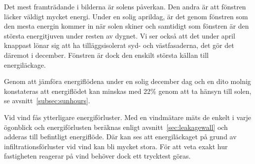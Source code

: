 Det mest framträdande i bilderna är solens påverkan. Den andra är att fönstren läcker väldigt 
mycket energi. Under en solig aprildag, är det genom fönstren som den mesta energin 
kommer in när solen skiner och samtidigt som fönstren är den största energitjuven under 
resten av dygnet. Vi ser också att det under april knappast lönar sig att ha tilläggsisolerat syd-
 och västfasaderna, det gör det däremot i december. Fönstren är dock den enskilt största 
 källan till energiläckage.

Genom att jämföra energiflödena under en solig december dag och en dito molnig konstateras att energiflödet kan minskas med 22\% genom att ta hänsyn till solen, se avsnitt~\ref{subsec:sunhours}.

Vid vind fås ytterligare energiförluster. Med en vindmätare mäts de enkelt i varje ögonblick och 
energiförlusten beräknas enligt avsnitt~\ref{sec:leakagewall} och adderas till befintligt energiflöde. Där kan ses att energiläckaget på grund av infiltrationsförluster vid vind kan bli mycket stora. För att veta exakt hur fastigheten reagerar på vind behöver dock ett trycktest göras.